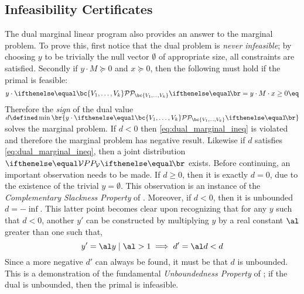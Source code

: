 \documentclass[aps, 10pt, english, twoside, pra, nofootinbib, longbibliography]{revtex4-1}
\theoremstyle{plain}
\theoremstyle{definition}
\theoremstyle{remark}
\begin{document}
    \subsection{Infeasibility Certificates}
    The dual marginal linear program also provides an answer to the marginal problem. To prove this, first notice that the dual problem is \textit{never infeasible}; by choosing $y$ to be trivially the null vector $\emptyset$ of appropriate size, all constraints are satisfied. Secondly if $y \cdot M \succeq 0$ and $x \succeq 0$, then the following must hold if the primal is feasible:
    \[ y \cdot \probvec[\bc{V_1, \ldots, V_k}] =  y \cdot M \cdot x \geq 0 \eq \label{eq:dual_marginal_ineq} \]
    Therefore the \textit{sign} of the dual value $d \defined \min \br{y \cdot \probvec[\bc{V_1, \ldots, V_k}]}$ solves the marginal problem. If $d < 0$ then \cref{eq:dual_marginal_ineq} is violated and therefore the marginal problem has negative result. Likewise if $d$ satisfies \cref{eq:dual_marginal_ineq}, then a joint distribution $\prob[\mathcal{V}]$ exists. Before continuing, an important observation needs to be made. If $d \geq 0$, then it is exactly $d = 0$, due to the existence of the trivial $y = \emptyset$. This observation is an instance of the \textit{Complementary Slackness Property} of \cite{Bradley_1977}.  Moreover, if $d < 0$, then it is unbounded $d = -\inf$. This latter point becomes clear upon recognizing that for any $y$ such that $d < 0$, another $y'$ can be constructed by multiplying $y$ by a real constant $\al$ greater than one such that,
    \[ y' = \al y \mid \al > 1 \implies d' = \al d < d \]
    Since a more negative $d'$ can always be found, it must be that $d$ is unbounded. This is a demonstration of the fundamental \textit{Unboundedness Property} of \cite{Bradley_1977}; if the dual is unbounded, then the primal is infeasible.


    
\end{document}
